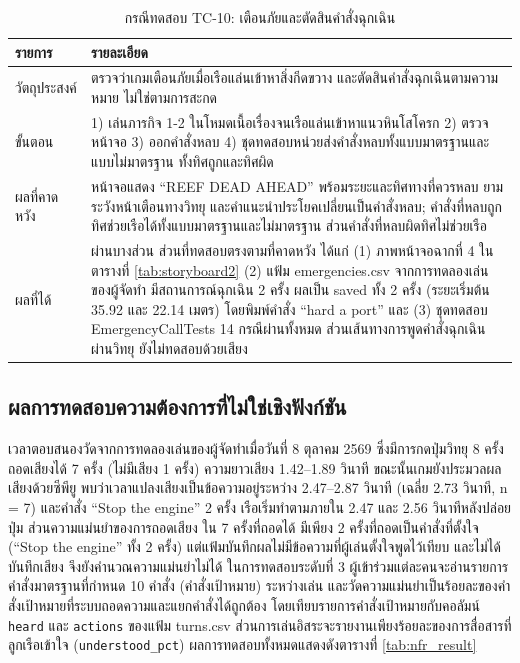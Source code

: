 \begin{table}[!htbp]
\centering
\caption{กรณีทดสอบ TC-10: เตือนภัยและตัดสินคำสั่งฉุกเฉิน}
\label{tab:tc10}
\begin{tabular}{|L{3.50cm}|L{10.20cm}|}
\hline
\textbf{รายการ} & \textbf{รายละเอียด} \\
\hline
วัตถุประสงค์ & ตรวจว่าเกมเตือนภัยเมื่อเรือแล่นเข้าหาสิ่งกีดขวาง และตัดสินคำสั่งฉุกเฉินตามความหมาย ไม่ใช่ตามการสะกด \\ \hline
ขั้นตอน & 1) เล่นภารกิจ 1-2 ในโหมดเนื้อเรื่องจนเรือแล่นเข้าหาแนวหินโสโครก 2) ตรวจหน้าจอ 3) ออกคำสั่งหลบ 4) ชุดทดสอบหน่วยส่งคำสั่งหลบทั้งแบบมาตรฐานและแบบไม่มาตรฐาน ทั้งทิศถูกและทิศผิด \\ \hline
ผลที่คาดหวัง & หน้าจอแสดง ``REEF DEAD AHEAD'' พร้อมระยะและทิศทางที่ควรหลบ ยามระวังหน้าเตือนทางวิทยุ และคำแนะนำประโยคเปลี่ยนเป็นคำสั่งหลบ; คำสั่งที่หลบถูกทิศช่วยเรือได้ทั้งแบบมาตรฐานและไม่มาตรฐาน ส่วนคำสั่งที่หลบผิดทิศไม่ช่วยเรือ \\ \hline
ผลที่ได้ & ผ่านบางส่วน ส่วนที่ทดสอบตรงตามที่คาดหวัง ได้แก่ (1) ภาพหน้าจอฉากที่ 4 ในตารางที่ \ref{tab:storyboard2} (2) แฟ้ม emergencies.csv จากการทดลองเล่นของผู้จัดทำ มีสถานการณ์ฉุกเฉิน 2 ครั้ง ผลเป็น saved ทั้ง 2 ครั้ง (ระยะเริ่มต้น 35.92 และ 22.14 เมตร) โดยพิมพ์คำสั่ง ``hard a port'' และ (3) ชุดทดสอบ EmergencyCallTests 14 กรณีผ่านทั้งหมด ส่วนเส้นทางการพูดคำสั่งฉุกเฉินผ่านวิทยุ ยังไม่ทดสอบด้วยเสียง \\
\hline
\end{tabular}
\end{table}

\subsection{ผลการทดสอบความต้องการที่ไม่ใช่เชิงฟังก์ชัน}

เวลาตอบสนองวัดจากการทดลองเล่นของผู้จัดทำเมื่อวันที่ 8 ตุลาคม 2569 ซึ่งมีการกดปุ่มวิทยุ 8 ครั้ง ถอดเสียงได้ 7 ครั้ง (ไม่มีเสียง 1 ครั้ง) ความยาวเสียง 1.42--1.89 วินาที ขณะนั้นเกมยังประมวลผลเสียงด้วยซีพียู พบว่าเวลาแปลงเสียงเป็นข้อความอยู่ระหว่าง 2.47--2.87 วินาที (เฉลี่ย 2.73 วินาที, n = 7) และคำสั่ง ``Stop the engine'' 2 ครั้ง เรือเริ่มทำตามภายใน 2.47 และ 2.56 วินาทีหลังปล่อยปุ่ม ส่วนความแม่นยำของการถอดเสียง ใน 7 ครั้งที่ถอดได้ มีเพียง 2 ครั้งที่ถอดเป็นคำสั่งที่ตั้งใจ (``Stop the engine'' ทั้ง 2 ครั้ง) แต่แฟ้มบันทึกผลไม่มีข้อความที่ผู้เล่นตั้งใจพูดไว้เทียบ และไม่ได้บันทึกเสียง จึงยังคำนวณความแม่นยำไม่ได้ ในการทดสอบระดับที่ 3 ผู้เข้าร่วมแต่ละคนจะอ่านรายการคำสั่งมาตรฐานที่กำหนด 10 คำสั่ง (คำสั่งเป้าหมาย) ระหว่างเล่น และวัดความแม่นยำเป็นร้อยละของคำสั่งเป้าหมายที่ระบบถอดความและแยกคำสั่งได้ถูกต้อง โดยเทียบรายการคำสั่งเป้าหมายกับคอลัมน์ \texttt{heard} และ \texttt{actions} ของแฟ้ม turns.csv ส่วนการเล่นอิสระจะรายงานเพียงร้อยละของการสื่อสารที่ลูกเรือเข้าใจ (\texttt{understood\_pct}) ผลการทดสอบทั้งหมดแสดงดังตารางที่ \ref{tab:nfr_result}

